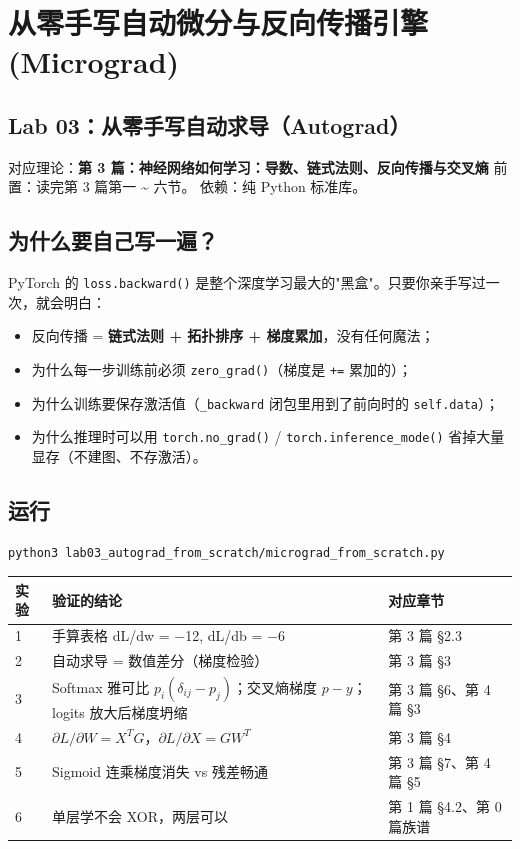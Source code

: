 \chapter{从零手写自动微分与反向传播引擎 (Micrograd)}

\section{Lab 03：从零手写自动求导（Autograd）}

\begin{noteBox}[核心导读与背景]
对应理论：\textbf{第 3 篇：神经网络如何学习：导数、链式法则、反向传播与交叉熵}
前置：读完第 3 篇第一 \textasciitilde{} 六节。
依赖：纯 Python 标准库。
\end{noteBox}

\section{为什么要自己写一遍？}

PyTorch 的 \texttt{loss.backward()} 是整个深度学习最大的"黑盒"。只要你亲手写过一次，就会明白：
\begin{itemize}
  \item 反向传播 = \textbf{链式法则 + 拓扑排序 + 梯度累加}，没有任何魔法；
  \item 为什么每一步训练前必须 \texttt{zero\_grad()}（梯度是 \texttt{+=} 累加的）；
  \item 为什么训练要保存激活值（\texttt{\_backward} 闭包里用到了前向时的 \texttt{self.data}）；
  \item 为什么推理时可以用 \texttt{torch.no\_grad()} / \texttt{torch.inference\_mode()} 省掉大量显存（不建图、不存激活）。
\end{itemize}

\section{运行}

\begin{lstlisting}[language=bash]
python3 lab03_autograd_from_scratch/micrograd_from_scratch.py
\end{lstlisting}

\begin{center}
\small
\begin{tabularx}{\textwidth}{p{3cm} p{4.5cm} X}
\toprule
\textbf{实验} & \textbf{验证的结论} & \textbf{对应章节} \\
\midrule
1 & 手算表格 dL/dw = −12, dL/db = −6 & 第 3 篇 §2.3 \\
2 & 自动求导 = 数值差分（梯度检验） & 第 3 篇 §3 \\
3 & Softmax 雅可比 $p_i(\delta_{ij}-p_j)$；交叉熵梯度 $p - y$；logits 放大后梯度坍缩 & 第 3 篇 §6、第 4 篇 §3 \\
4 & $\partial L/\partial W = X^T G$，$\partial L/\partial X = G W^T$ & 第 3 篇 §4 \\
5 & Sigmoid 连乘梯度消失 vs 残差畅通 & 第 3 篇 §7、第 4 篇 §5 \\
6 & 单层学不会 XOR，两层可以 & 第 1 篇 §4.2、第 0 篇族谱 \\
\bottomrule
\end{tabularx}
\end{center}

